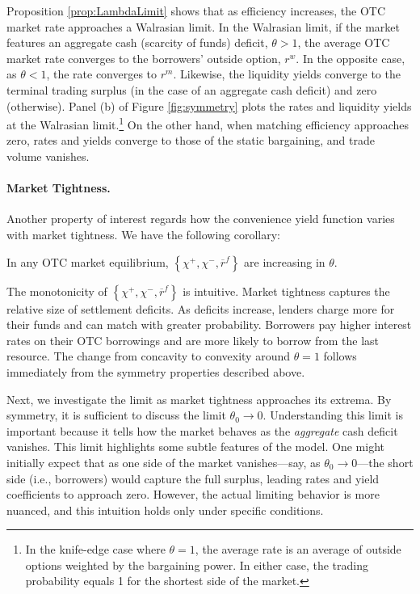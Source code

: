 \documentclass[12pt,american,english,notitlepage]{article}
\begin{document}
Proposition \ref{prop:LambdaLimit} shows that
as efficiency increases, the OTC market rate approaches a Walrasian
limit. In the Walrasian limit, if the market features an aggregate cash (scarcity
of funds) deficit, $\theta>1$, the average OTC market rate converges
to the borrowers' outside option, $r^{w}$. In the opposite case, as
$\theta<1$, the rate converges to $r^{m}$. Likewise, the liquidity
yields converge to the terminal trading surplus (in the case of an
aggregate cash deficit) and zero (otherwise). Panel (b) of Figure
\ref{fig:symmetry} plots the rates and liquidity yields at the Walrasian
limit.\footnote{In the knife-edge case where $\theta=1$, the average rate is an average
of outside options weighted by the bargaining power. In either case, the trading probability equals 1 for the shortest side of the market.} On the other hand, when matching efficiency approaches zero, rates and yields converge
to those of the static bargaining, and trade volume vanishes. 

\paragraph{Market Tightness. }


Another property of interest regards how the convenience yield function varies with market tightness.  We have the following corollary:
\begin{corollary}\label{cor:monotonicity.theta}
In any OTC market equilibrium, $\left\{ \chi^{+},\chi^{-},\overline{r}^{f}\right\} $
are increasing in $\theta$.
\end{corollary}

The monotonicity of $\left\{ \chi^{+},\chi^{-},\overline{r}^{f}\right\} $
is intuitive. Market tightness captures the relative size of settlement
deficits. As deficits increase, lenders charge more for their funds
and can match with greater probability. Borrowers pay higher interest rates
on their OTC borrowings and are more likely to borrow from the last
resource. The change from concavity to convexity around $\theta=1$
follows immediately from the symmetry properties described above.

Next, we investigate the limit as market tightness approaches its
extrema. By symmetry, it is sufficient to discuss the limit $\theta_{0}\rightarrow0$.
Understanding this limit is important because it tells how the market
behaves as the \textit{aggregate} cash deficit vanishes. 
This limit highlights some subtle features of the model. One might initially expect that as one side of the market vanishes—say, as $\theta_0 \to 0$—the short side (i.e., borrowers) would capture the full surplus, leading rates and yield coefficients to approach zero. However, the actual limiting behavior is more nuanced, and this intuition holds only under specific conditions.
\end{document}
